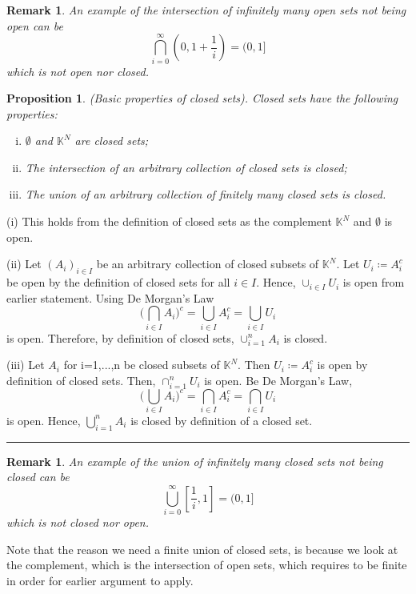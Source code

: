 \documentclass[twoside]{article}
\newtheorem{proposition}[theorem]{Proposition}
\newtheorem{remark}[theorem]{Remark}
\newenvironment{proof}{{\bf Proof:}}{\hfill\rule{2mm}{2mm}}
\begin{document}
\begin{remark} An example of the intersection of infinitely many open sets not being open can be
$$
\bigcap_{i=0}^{\infty}(0, 1 + \frac{1}{i}) = (0,1]
$$
which is not open nor closed.
\end{remark}


\begin{proposition}(Basic properties of closed sets). Closed sets have the following properties:
\begin{enumerate}[(i)]
  \item $\emptyset$ and $\mathbb{K}^N$ are closed sets;
  \item The intersection of an arbitrary collection of closed sets is closed;
  \item The union of an arbitrary collection of finitely many closed sets is closed.
\end{enumerate}
\end{proposition}

\begin{proof}(i) This holds from the definition of closed sets as the complement $\mathbb{K}^N$ and $\emptyset$ is open.

(ii) Let $(A_i)_{i \in I}$ be an arbitrary collection of closed subsets of $\mathbb{K}^N$. Let $U_i \coloneqq A_i^c$ be open by the definition of closed sets for all $i \in I$. Hence, $\cup_{i \in I}U_i$ is open from earlier statement. Using De Morgan's Law
$$
\big(\bigcap_{i \in I}A_i\big)^c = \bigcup_{i \in I}A_i^c = \bigcup_{i \in I}U_i
$$
is open. Therefore, by definition of closed sets, $\cup_{i=1}^nA_i$ is closed.

(iii) Let $A_i$ for i=1,...,n be closed subsets of $\mathbb{K}^N$. Then $U_i \coloneqq A_i^c$ is open by definition of closed sets. Then, $\cap_{i=1}^nU_i$ is open. Be De Morgan's Law, 
$$
\big(\bigcup_{i \in I}A_i\big)^c = \bigcap_{i \in I}A_i^c = \bigcap_{i \in I}U_i
$$
is open. Hence, $\bigcup_{i=1}^nA_i$ is closed by definition of a closed set.
\end{proof}

\begin{remark} An example of the union of infinitely many closed sets not being closed can be
$$
\bigcup_{i=0}^{\infty}[\frac{1}{i}, 1] = (0,1]
$$
which is not closed nor open.
\end{remark}

Note that the reason we need a finite union of closed sets, is because we look at the complement, which is the intersection of open sets, which requires to be finite in order for earlier argument to apply.
\end{document}
